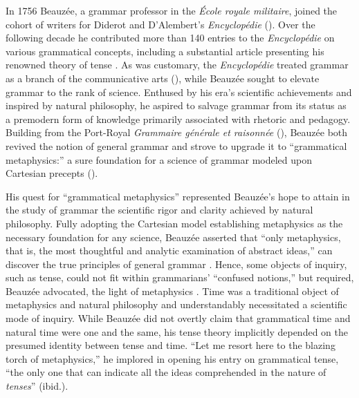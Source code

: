 \documentclass[english,output=paper,colorlinks,citecolor=brown]{../langscibook}
\begin{document}
 In 1756 Beauzée, a grammar professor in the \textit{École royale militaire}, joined the cohort of writers for Diderot and D'Alembert's \textit{Encyclopédie} (\citealt{Le-Guern2009}). Over the following decade he contributed more than 140 entries to the \textit{Encyclopédie} on various grammatical concepts, including a substantial article presenting his renowned theory of tense \citep{Beauzée1765}. As was customary, the \textit{Encyclopédie} treated grammar as a branch of the communicative arts (\citealt{DAlembertDiderot1751}), while Beauzée sought to elevate grammar to the rank of science. Enthused by his era’s scientific achievements and inspired by natural philosophy, he aspired to salvage grammar from its status as a premodern form of knowledge primarily associated with rhetoric and pedagogy. Building from the Port-Royal \textit{Grammaire générale et raisonnée} (\citealt{ArnauldLancelot1660}), Beauzée both revived the notion of general grammar and strove to upgrade it to “grammatical metaphysics:” a sure foundation for a science of grammar modeled upon Cartesian precepts (\citealt{Chalozin-Dovrat2019Beauzee}).
 
 His quest for “grammatical metaphysics” represented Beauzée’s hope to attain in the study of grammar the scientific rigor and clarity achieved by natural philosophy. Fully adopting the Cartesian model establishing metaphysics as the necessary foundation for any science, Beauzée asserted that “only metaphysics, that is, the most thoughtful and analytic examination of abstract ideas,” can discover the true principles of general grammar \citep[vol.1: xxxiij–xxxv]{Beauzée1767}. Hence, some objects of inquiry, such as tense, could not fit within grammarians’ “confused notions,” but required, Beauzée advocated, the light of metaphysics \citep[96]{Beauzée1767}. Time was a traditional object of metaphysics and natural philosophy and understandably necessitated a scientific mode of inquiry. While Beauzée did not overtly claim that grammatical time and natural time were one and the same, his tense theory implicitly depended on the presumed identity between tense and time. “Let me resort here to the blazing torch of metaphysics,” he implored in opening his entry on grammatical tense, “the only one that can indicate all the ideas comprehended in the nature of \textit{tenses}” (ibid.).
 
\end{document}
